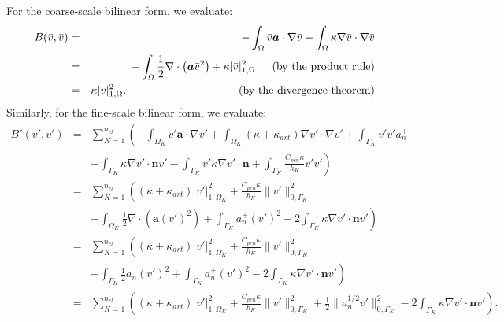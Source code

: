 \documentclass[11pt]{article}
\newenvironment{proof}[1][Proof]{\begin{trivlist}
\item[\hskip \labelsep {\bfseries #1}]}{\end{trivlist}}
\begin{document}
\begin{proof}
For the coarse-scale bilinear form, we evaluate:
\begin{eqnarray}
\bar{B}(\bar{v},\bar{v}) & = & -\int_{\Omega} \bar{v} \bm{a} \cdot \nabla \bar{v} + \int_{\Omega} \kappa \nabla \bar{v} \cdot \nabla \bar{v} \nonumber \\
& = & - \int_{\Omega} \frac{1}{2} \nabla \cdot \left( \bm{a} \bar{v}^2 \right) + \kappa | \bar{v} |^2_{1,\Omega} \hspace{15pt} \textup{(by the product rule)} \nonumber \\
& = & \kappa | \bar{v} |^2_{1,\Omega}. \hspace{102pt} \textup{(by the divergence theorem)} \label{eq:th1_begin}
\end{eqnarray}
Similarly, for the fine-scale bilinear form, we evaluate:
\begin{eqnarray}
B'(v',v') & = & \sum_{K=1}^{n_{el}} \left( -\int_{\Omega_K} v' \bm{a} \cdot \nabla v' + \int_{\Omega_K} \left( \kappa + \kappa_{art} \right) \nabla v' \cdot \nabla v' + \int_{\Gamma_K} v' v' a_n^+ \right. \nonumber \\
& & \left. - \int_{\Gamma_K} \kappa \nabla v' \cdot \bm{n} v' - \int_{\Gamma_K} v' \kappa \nabla v' \cdot \bm{n} + \int_{\Gamma_K} \frac{C_{pen} \kappa}{h_K} v' v' \right) \nonumber \\
 & = & \sum_{K=1}^{n_{el}} \left( \left( \kappa + \kappa_{art} \right) | v' |^2_{1,\Omega_K} + \frac{C_{pen}\kappa}{h_K} \| v' \|^2_{0,\Gamma_K} \right. \nonumber \\
& & \left. -\int_{\Omega_K} \frac{1}{2} \nabla \cdot \left( \bm{a} \left(v'\right)^2 \right) + \int_{\Gamma_K} a_n^+ \left(v'\right)^2 - 2 \int_{\Gamma_K} \kappa \nabla v' \cdot \bm{n} v' \right) \nonumber \\
 & = & \sum_{K=1}^{n_{el}} \left( \left( \kappa + \kappa_{art} \right) | v' |^2_{1,\Omega_K} + \frac{C_{pen}\kappa}{h_K} \| v' \|^2_{0,\Gamma_K} \right. \nonumber \\
& & \left. -\int_{\Gamma_K} \frac{1}{2} a_n \left(v'\right)^2 + \int_{\Gamma_K} a_n^+ \left(v'\right)^2 - 2 \int_{\Gamma_K} \kappa \nabla v' \cdot \bm{n} v' \right) \nonumber \\
 & = & \sum_{K=1}^{n_{el}} \left( \left( \kappa + \kappa_{art} \right) | v' |^2_{1,\Omega_K} + \frac{C_{pen}\kappa}{h_K} \| v' \|^2_{0,\Gamma_K} + \frac{1}{2} \| a_n^{1/2} v' \|^2_{0,\Gamma_K} - 2 \int_{\Gamma_K} \kappa \nabla v' \cdot \bm{n} v' \right). \nonumber \\
\end{eqnarray}

\end{proof}
\end{document}
